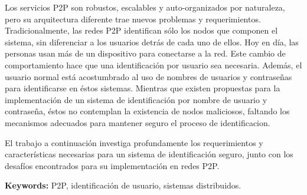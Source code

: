 Los servicios P2P son robustos, escalables y auto-organizados por naturaleza,
pero su arquitectura diferente trae nuevos problemas y requerimientos.
Tradicionalmente, las redes P2P identifican sólo los nodos que componen el
sistema, sin diferenciar a los usuarios detrás de cada uno de ellos.
Hoy en día, las personas usan más de un dispositivo para conectarse a la red.
Este cambio de comportamiento hace que una identificación por usuario sea
necesaria. Además, el usuario normal está acostumbrado al uso de nombres de
usuarios y contraseñas para identificarse en éstos sistemas.
Mientras que existen propuestas para la implementación de un sistema de
identificación por nombre de usuario y contraseña, éstos no contemplan la
existencia de nodos maliciosos, faltando los mecanismos adecuados para
mantener seguro el proceso de identificacion.

El trabajo a continuación investiga profundamente los requerimientos y
características necesarias para un sistema de identificación seguro, junto con
los desafíos encontrados para su implementación en redes P2P.


%

{\bf Keywords:} P2P, identificación de usuario, sistemas distribuidos.
